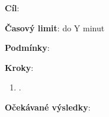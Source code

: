






\vspace{1em}

\textbf{Cíl}: 

\textbf{Časový limit}: do Y minut

\textbf{Podmínky}: 

\textbf{Kroky}:

\begin{enumerate}[leftmargin=1.4cm]
    \item .
\end{enumerate}

\textbf{Očekávané výsledky}:

